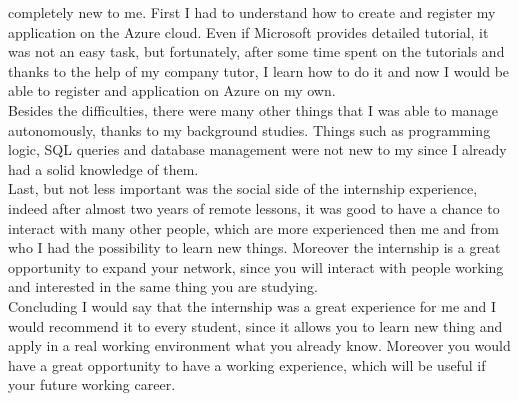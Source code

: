 \documentclass[12pt, a4paper, oneside]{article}
\begin{document}
completely new to me. First I had to understand how to create and register my application on the Azure cloud. Even if Microsoft provides detailed tutorial, it was not an easy task, but fortunately, after some time
spent on the tutorials and thanks to the help of my company tutor, I learn how to do it and now I would be able to register and application on Azure on my own.\\
Besides the difficulties, there were many other things that I was able to manage autonomously, thanks to my background studies. Things such as programming logic, SQL queries and database management were not new
to my since I already had a solid knowledge of them.\\
Last, but not less important was the social side of the internship experience, indeed after almost two years of remote lessons, it was good to have a chance to interact with many other people, which are more
experienced then me and from who I had the possibility to learn new things. Moreover the internship is a great opportunity to expand your network, since you will interact with people working and interested in
the same thing you are studying.\\
Concluding I would say that the internship was a great experience for me and I would recommend it to every student, since it allows you to learn new thing and apply in a real working environment what you already know.
Moreover you would have a great opportunity to have a working experience, which will be useful if your future working career.

\newpage
\end{document}
